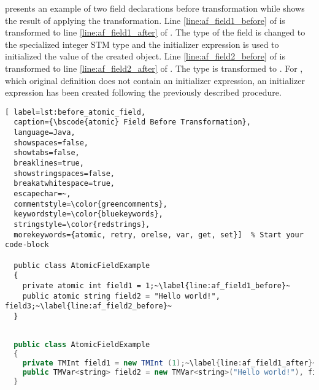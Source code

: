  presents an example of two  field declarations before transformation while  shows the result of applying the transformation. Line \ref{line:af_field1_before} of  is transformed to line \ref{line:af_field1_after} of . The type of the field is changed to the specialized integer \ac{STM} type  and the initializer expression is used to initialized the value of the created  object. Line \ref{line:af_field2_before} of  is transformed to line \ref{line:af_field2_after} of . The type is transformed to . For , which original definition does not contain an initializer expression, an initializer expression has been created following the previously described procedure.

\begin{lstlisting}[ label=lst:before_atomic_field,
  caption={\bscode{atomic} Field Before Transformation},
  language=Java,  
  showspaces=false,
  showtabs=false,
  breaklines=true,
  showstringspaces=false,
  breakatwhitespace=true,
  escapechar=~,
  commentstyle=\color{greencomments},
  keywordstyle=\color{bluekeywords},
  stringstyle=\color{redstrings},
  morekeywords={atomic, retry, orelse, var, get, set}]  % Start your code-block

  public class AtomicFieldExample
  {
    private atomic int field1 = 1;~\label{line:af_field1_before}~
    public atomic string field2 = "Hello world!", field3;~\label{line:af_field2_before}~
  }
\end{lstlisting}

\begin{lstlisting}[label=lst:after_atomic_field,
  caption={\bscode{atomic} Field After Transformation},
  language=Java,  
  showspaces=false,
  showtabs=false,
  breaklines=true,
  showstringspaces=false,
  breakatwhitespace=true,
  escapechar=~,
  commentstyle=\color{greencomments},
  keywordstyle=\color{bluekeywords},
  stringstyle=\color{redstrings},
  morekeywords={atomic, retry, orelse, var, get, set, string}]  % Start your code-block

  public class AtomicFieldExample
  {
    private TMInt field1 = new TMInt (1);~\label{line:af_field1_after}~
    public TMVar<string> field2 = new TMVar<string>("Hello world!"), field3 = new TMVar<string>();~\label{line:af_field2_after}~
  }
\end{lstlisting}


